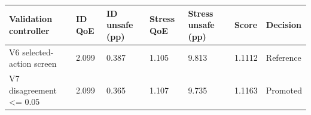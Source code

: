 \begin{tabular}{lllllll}
\toprule
Validation controller & ID QoE & ID unsafe (pp) & Stress QoE & Stress unsafe (pp) & Score & Decision \\
\midrule
V6 selected-action screen & 2.099 & 0.387 & 1.105 & 9.813 & 1.1112 & Reference \\
V7 disagreement <= 0.05 & 2.099 & 0.365 & 1.107 & 9.735 & 1.1163 & Promoted \\
\bottomrule
\end{tabular}
